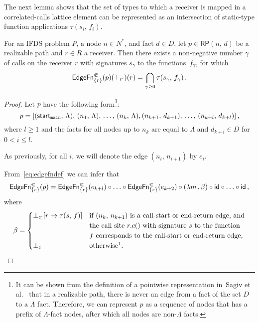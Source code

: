 The next lemma shows that the set of types to which a receiver is mapped in a correlated-calls lattice element can be represented as an intersection of static-type function applications $\tau(s_i,\,f_i)$.
\begin{lemma}\label{lem:edgefnThroughTaus}
  For an IFDS problem $P$, a node $n\in N^*$, and fact $d\in D$, let $p\in\mathsf{RP}(n,\,d)$ be a realizable path and $r\in R$ a receiver. Then there exists a non-negative number $\gamma$ of calls on the receiver $r$ with signatures $s_\gamma$ to the functions~$f_\gamma$, for which
  \[
    \textsf{EdgeFn}^\Subset_{\{r\}}(p)(\top_\Subset)(r)=
      \bigcap_{\gamma\ge0}\tau(s_\gamma,\,f_\gamma)\,.
  \]
\end{lemma}
\begin{proof}
  Let $p$ have the following form\footnote{It can be shown from the definition of a pointwise representation in~Sagiv et al.~\cite{sagiv1996precise} that in a realizable path, there is never an edge from a fact of the set $D$ to a $\Lambda$ fact. Therefore, we can represent $p$ as a sequence of nodes that has a prefix of $\Lambda$-fact nodes, after which all nodes are non-$\Lambda$ facts.}:
  \[
    p=[(\textsf{start}_\texttt{main},\,\Lambda),\,(n_1,\,\Lambda),\,\dots,\,(n_k,\,\Lambda),
       (n_{k+1},\,d_{k+1}),\,\dots,\,(n_{k+l},\,d_{k+l})]\,,
  \]
  where $l\ge1$ and the facts for all nodes up to $n_k$ are equal to $\Lambda$ and $d_{k+i}\in D$ for $0<i\le l$.
  
  As previously, for all $i$, we will denote the edge $(n_i,\,n_{i+1})$ by $e_i$.  
  
  From~\eqref{eq:edgefndef} we can infer that
  \[
    \textsf{EdgeFn}^\Subset_{\{r\}}(p)=
    \textsf{EdgeFn}^\Subset_{\{r\}}(e_{k+l})
    \circ\ldots
    \circ\textsf{EdgeFn}^\Subset_{\{r\}}(e_{k+2})
    \circ(\lambda m\,.\,\beta)
    \circ\textsf{id}
    \circ\ldots
    \circ\textsf{id}\,,
  \]
  where
  \[
    \beta=
    \begin{cases}
      \botcc[r\to\tau(s,\,f)]&\text{if $(n_k,\,n_{k+1})$ is a call-start or end-return edge, and}\\&\text{the call site $r.c()$ with signature $s$ to the function}\\
      &\text{$f$ corresponds to the call-start or end-return edge,}\\
      \botcc&\text{otherwise\footnotemark.}
    \end{cases}
  \]
  

\end{proof}
